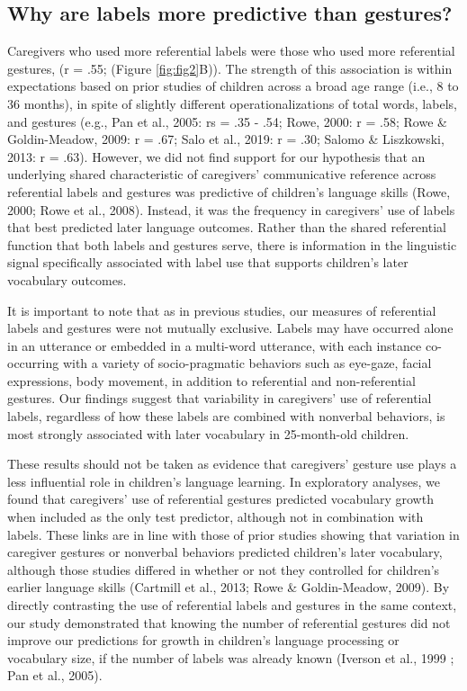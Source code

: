 \documentclass[
  man,floatsintext]{apa6}
\begin{document}
\hypertarget{why-are-labels-more-predictive-than-gestures}{%
\subsection{Why are labels more predictive than gestures?}\label{why-are-labels-more-predictive-than-gestures}}

Caregivers who used more referential labels were those who used more referential gestures, (r = .55; (Figure \ref{fig:fig2}B)). The strength of this association is within expectations based on prior studies of children across a broad age range (i.e., 8 to 36 months), in spite of slightly different operationalizations of total words, labels, and gestures (e.g., Pan et al., 2005: rs = .35 - .54; Rowe, 2000: r = .58; Rowe \& Goldin-Meadow, 2009: r = .67; Salo et al., 2019: r = .30; Salomo \& Liszkowski, 2013: r = .63). However, we did not find support for our hypothesis that an underlying shared characteristic of caregivers' communicative reference across referential labels and gestures was predictive of children's language skills (Rowe, 2000; Rowe et al., 2008). Instead, it was the frequency in caregivers' use of labels that best predicted later language outcomes. Rather than the shared referential function that both labels and gestures serve, there is information in the linguistic signal specifically associated with label use that supports children's later vocabulary outcomes.

It is important to note that as in previous studies, our measures of referential labels and gestures were not mutually exclusive. Labels may have occurred alone in an utterance or embedded in a multi-word utterance, with each instance co-occurring with a variety of socio-pragmatic behaviors such as eye-gaze, facial expressions, body movement, in addition to referential and non-referential gestures. Our findings suggest that variability in caregivers' use of referential labels, regardless of how these labels are combined with nonverbal behaviors, is most strongly associated with later vocabulary in 25-month-old children.

These results should not be taken as evidence that caregivers' gesture use plays a less influential role in children's language learning. In exploratory analyses, we found that caregivers' use of referential gestures predicted vocabulary growth when included as the only test predictor, although not in combination with labels. These links are in line with those of prior studies showing that variation in caregiver gestures or nonverbal behaviors predicted children's later vocabulary, although those studies differed in whether or not they controlled for children's earlier language skills (Cartmill et al., 2013; Rowe \& Goldin-Meadow, 2009). By directly contrasting the use of referential labels and gestures in the same context, our study demonstrated that knowing the number of referential gestures did not improve our predictions for growth in children's language processing or vocabulary size, if the number of labels was already known (Iverson et al., 1999 ; Pan et al., 2005).
\end{document}
